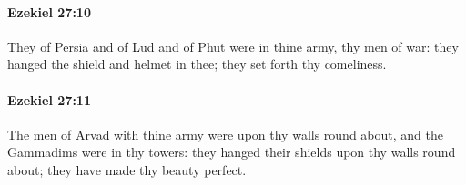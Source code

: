 		\paragraph{Ezekiel 27:10} %
			\label{EZEKIEL-27-10}

			They of Persia and of Lud and of Phut were in thine army, thy men of war: they hanged the shield and helmet in thee; they set forth thy comeliness.


		\paragraph{Ezekiel 27:11} %
			\label{EZEKIEL-27-11}

			The men of Arvad with thine army were upon thy walls round about, and the Gammadims were in thy towers: they hanged their shields upon thy walls round about; they have made thy beauty perfect.



